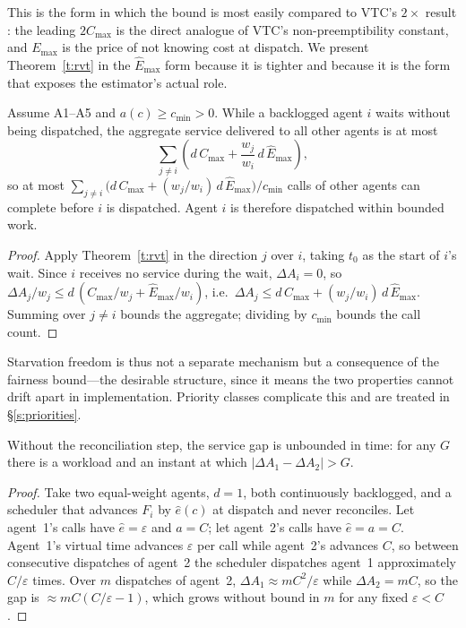 \documentclass[letterpaper,11pt,leqno]{article}
\begin{document}
This is the form in which the bound is most easily compared to VTC's $2\times$ result \citep{Sheng24}: the leading $2C_{\max}$ is the direct analogue of VTC's non-preemptibility constant, and $E_{\max}$ is the price of not knowing cost at dispatch. We present Theorem~\ref{t:rvt} in the $\hat{E}_{\max}$ form because it is tighter and because it is the form that exposes the estimator's actual role.

\begin{corollary}\label{c:starvation}
Assume A1--A5 and $a(c) \ge c_{\min} > 0$. While a backlogged agent $i$ waits without being dispatched, the aggregate service delivered to all other agents is at most
\[
  \sum_{j \ne i} \left( d\,C_{\max} + \frac{w_j}{w_i}\, d\,\hat{E}_{\max} \right),
\]
so at most $\sum_{j \ne i} \bigl(d\,C_{\max} + (w_j/w_i)\,d\,\hat{E}_{\max}\bigr) / c_{\min}$ calls of other agents can complete before $i$ is dispatched. Agent $i$ is therefore dispatched within bounded work.
\end{corollary}

\begin{proof}
Apply Theorem~\ref{t:rvt} in the direction $j$ over $i$, taking $t_0$ as the start of $i$'s wait. Since $i$ receives no service during the wait, $\Delta A_i = 0$, so $\Delta A_j / w_j \le d\,(C_{\max}/w_j + \hat{E}_{\max}/w_i)$, i.e.\ $\Delta A_j \le d\,C_{\max} + (w_j/w_i)\,d\,\hat{E}_{\max}$. Summing over $j \ne i$ bounds the aggregate; dividing by $c_{\min}$ bounds the call count.
\end{proof}

Starvation freedom is thus not a separate mechanism but a consequence of the fairness bound---the desirable structure, since it means the two properties cannot drift apart in implementation. Priority classes complicate this and are treated in \S\ref{s:priorities}.

\begin{proposition}\label{p:norecon}
Without the reconciliation step, the service gap is unbounded in time: for any $G$ there is a workload and an instant at which $|\Delta A_1 - \Delta A_2| > G$.
\end{proposition}

\begin{proof}
Take two equal-weight agents, $d = 1$, both continuously backlogged, and a scheduler that advances $F_i$ by $\hat{e}(c)$ at dispatch and never reconciles. Let agent~1's calls have $\hat{e} = \varepsilon$ and $a = C$; let agent~2's calls have $\hat{e} = a = C$. Agent~1's virtual time advances $\varepsilon$ per call while agent~2's advances $C$, so between consecutive dispatches of agent~2 the scheduler dispatches agent~1 approximately $C/\varepsilon$ times. Over $m$ dispatches of agent~2, $\Delta A_1 \approx m C^2/\varepsilon$ while $\Delta A_2 = mC$, so the gap is $\approx mC(C/\varepsilon - 1)$, which grows without bound in $m$ for any fixed $\varepsilon < C$.
\end{proof}
\end{document}
